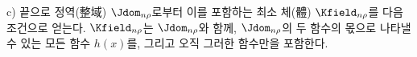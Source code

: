 
c) 끝으로 정역(整域) $\Jdom_{n\rho}$로부터 이를 포함하는 최소 체(體) $\Kfield_{n\rho}$를 다음 조건으로 얻는다. $\Kfield_{n\rho}$는 $\Jdom_{n\rho}$와 함께, $\Jdom_{n\rho}$의 두 함수의 몫으로 나타낼 수 있는 모든 함수 $h(x)$를, 그리고 오직 그러한 함수만을 포함한다.

